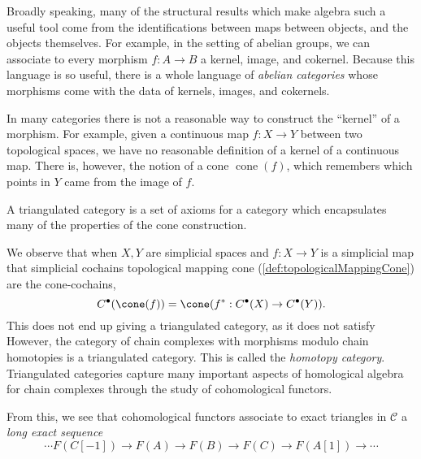 

Broadly speaking, many of the structural results which make algebra such a useful tool come from the identifications between maps between objects, and the objects themselves. For example, in the setting of abelian groups, we can associate to every morphism $f: A\to B$ a kernel, image, and cokernel. Because this language is so useful, there is a whole language of \emph{abelian categories} whose morphisms come with the data of kernels, images, and cokernels.

In many categories there is not a reasonable way to construct the ``kernel'' of a morphism. For example, given a continuous map $f: X\to Y$ between two topological spaces, we have no reasonable definition of a kernel of a continuous map. There is, however, the notion of a cone $\operatorname{cone}(f)$, which remembers which points in $Y$ came from the image of $f$. 


A triangulated category is a set of axioms for a category which encapsulates many of the properties of the cone construction. 


We observe that when $X, Y$ are simplicial spaces and $f:X\to Y$ is a simplicial map that simplicial cochains topological mapping cone (\cref{def:topologicalMappingCone}) are the cone-cochains,
\[C^\bullet(\cone(f))=\cone(f^*:C^\bullet(X)\to C^\bullet(Y)).\]
This does not end up giving a triangulated category, as it does not satisfy 
However, the category of chain complexes with morphisms modulo chain homotopies is a triangulated category. This is called the \emph{homotopy category}.
Triangulated categories capture many important aspects of homological algebra for chain complexes through the study of cohomological functors. 

From this, we see that cohomological functors associate to exact triangles in $\mathcal C$ a \emph{long exact sequence}
\[\cdots F(C[-1])\to F(A)\to F(B)\to F(C)\to F(A[1])\to \cdots \]



